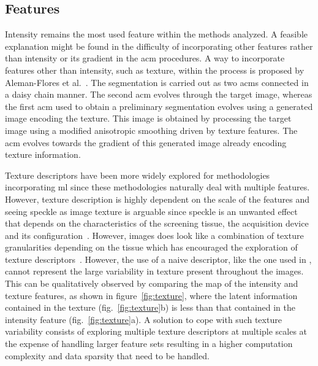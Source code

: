 \documentclass[authoryear,preprint,review,12pt]{elsarticle}
\begin{document}
\subsection{Features}
Intensity remains the most used feature within the methods analyzed. A feasible explanation might be found in the difficulty of incorporating other features rather than intensity or its gradient in the \ac{acm} procedures. 
A way to incorporate features other than intensity, such as texture, within the process is proposed by Aleman-Flores et al.~\cite{AlemanFlores:2007p14310}.
The segmentation is carried out as two \acp{acm} connected in a daisy chain manner. The second \ac{acm} evolves through the target image, whereas the first \ac{acm} used to obtain a preliminary segmentation evolves using a generated image encoding the texture. This image is obtained by processing the target image using a modified anisotropic smoothing driven by texture features. The \ac{acm} evolves towards the gradient of this generated image already encoding texture information.

Texture descriptors have been more widely explored for methodologies incorporating \ac{ml} since these methodologies naturally deal with multiple features. However, texture description is highly dependent on the scale of the features and seeing speckle as image texture is arguable since speckle is an unwanted effect that depends on the characteristics of the screening tissue, the acquisition device and its configuration~\cite{Ensminger:2008p6920}. However, images does look like a combination of texture granularities depending on the tissue which has encouraged the exploration of texture descriptors~\cite{massich2010lesion,massich2011seed,massich2012seed,Madabhushi:2003p6036,Liu:2012p14316,hao2012combining,Huang:2005p11636}. However, the use of a naive descriptor, like the one used in \cite{massich2010lesion,massich2011seed,Madabhushi:2003p6036}, cannot represent the large variability in texture present throughout the images. This can be qualitatively observed by comparing the \ac{map} of the intensity and texture features, as shown in figure~\ref{fig:texture}, where the latent information contained in the texture (fig.~\ref{fig:texture}b) is less than that contained in the intensity feature (fig.~\ref{fig:texture}a).
A solution to cope with such texture variability consists of exploring multiple texture descriptors at multiple scales at the expense of handling larger feature sets resulting in a higher computation complexity and data sparsity that need to be handled. 
\end{document}
